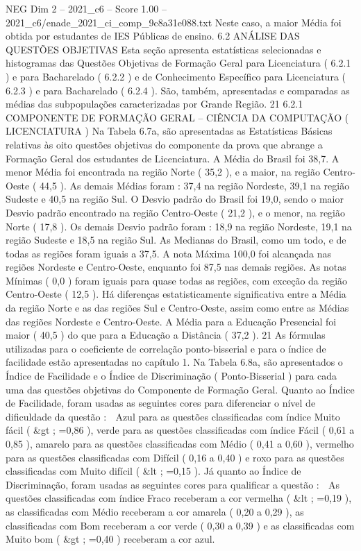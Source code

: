 \begin{textsample}{NEG Dim 2 – 2021\_c6 – Score 1.00 – 2021\_c6/enade\_2021\_ci\_comp\_9c8a31e088.txt}
Neste caso, a maior Média foi obtida por estudantes de IES Públicas de ensino. 6.2 ANÁLISE DAS QUESTÕES OBJETIVAS Esta seção apresenta estatísticas selecionadas e histogramas das Questões Objetivas de Formação Geral para Licenciatura ( 6.2.1 ) e para Bacharelado ( 6.2.2 ) e de Conhecimento Específico para Licenciatura ( 6.2.3 ) e para Bacharelado ( 6.2.4 ).
São, também, apresentadas e comparadas as médias das subpopulações caracterizadas por Grande Região. 21 6.2.1 COMPONENTE DE FORMAÇÃO GERAL – CIÊNCIA DA COMPUTAÇÃO ( LICENCIATURA ) Na Tabela 6.7a, são apresentadas as Estatísticas Básicas relativas às oito questões objetivas do componente da prova que abrange a Formação Geral dos estudantes de Licenciatura.
A Média do Brasil foi 38,7.
A menor Média foi encontrada na região Norte ( 35,2 ), e a maior, na região Centro-Oeste ( 44,5 ).
As demais Médias foram : 37,4 na região Nordeste, 39,1 na região Sudeste e 40,5 na região Sul.
O Desvio padrão do Brasil foi 19,0, sendo o maior Desvio padrão encontrado na região Centro-Oeste ( 21,2 ), e o menor, na região Norte ( 17,8 ).
Os demais Desvio padrão foram : 18,9 na região Nordeste, 19,1 na região Sudeste e 18,5 na região Sul.
As Medianas do Brasil, como um todo, e de todas as regiões foram iguais a 37,5.
A nota Máxima 100,0 foi alcançada nas regiões Nordeste e Centro-Oeste, enquanto foi 87,5 nas demais regiões.
As notas Mínimas ( 0,0 ) foram iguais para quase todas as regiões, com exceção da região Centro-Oeste ( 12,5 ).
Há diferenças estatisticamente significativa entre a Média da região Norte e as das regiões Sul e Centro-Oeste, assim como entre as Médias das regiões Nordeste e Centro-Oeste.
A Média para a Educação Presencial foi maior ( 40,5 ) do que para a Educação a Distância ( 37,2 ). 21 As fórmulas utilizadas para o coeficiente de correlação ponto-bisserial e para o índice de facilidade estão apresentadas no capítulo 1.
Na Tabela 6.8a, são apresentados o Índice de Facilidade e o Índice de Discriminação ( Ponto-Bisserial ) para cada uma das questões objetivas do Componente de Formação Geral.
Quanto ao Índice de Facilidade, foram usadas as seguintes cores para diferenciar o nível de dificuldade da questão :  Azul para as questões classificadas com índice Muito fácil ( \&gt ; =0,86 ), verde para as questões classificadas com índice Fácil ( 0,61 a 0,85 ), amarelo para as questões classificadas com Médio ( 0,41 a 0,60 ), vermelho para as questões classificadas com Difícil ( 0,16 a 0,40 ) e roxo para as questões classificadas com Muito difícil ( \&lt ; =0,15 ).
Já quanto ao Índice de Discriminação, foram usadas as seguintes cores para qualificar a questão :  As questões classificadas com índice Fraco receberam a cor vermelha ( \&lt ; =0,19 ), as classificadas com Médio receberam a cor amarela ( 0,20 a 0,29 ), as classificadas com Bom receberam a cor verde ( 0,30 a 0,39 ) e as classificadas com Muito bom ( \&gt ; =0,40 ) receberam a cor azul.

\end{textsample}
